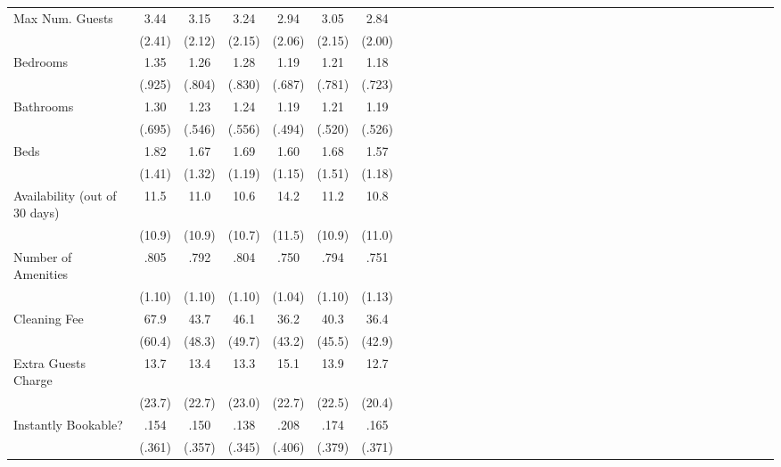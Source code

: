 {\begin{longtable}{l*{6}{c|c|cccc}}
Max Num. Guests   & 3.44   &      3.15	&      3.24  &      2.94		&    3.05 		&	 2.84\\
               & (2.41)    &     (2.12)         &     (2.15)         &     (2.06)         &     (2.15)         & (2.00)\\
Bedrooms    &  1.35 &      1.26 &      1.28         &      1.19         &      1.21   & 1.18      \\
              &   (.925)   &     (.804)         &     (.830)         &     (.687)         &     (.781)       & (.723)  \\
Bathrooms  & 1.30  &      1.23         &       1.24         &      1.19         &      1.21 & 1.19         \\
                &  (.695)  &     (.546)         &     (.556)         &     (.494)         &     (.520)         & (.526)\\
Beds       & 1.82  &      1.67 &      1.69         &      1.60         &      1.68         & 1.57\\
               &   (1.41)  &     (1.32)         &     (1.19)         &     (1.15)         &     (1.51)   & (1.18)      \\
Availability (out of 30 days)    & 11.5   &      11.0&      10.6&      14.2 &      11.2  	& 	10.8\\
         &  (10.9)    & (10.9)     &     (10.7)  &     (11.5)  &     (10.9)         &     (11.0)         \\
Number of Amenities   &   .805  &      .792		&      .804&      .750 &      .794  	& 	.751\\
         						  &  (1.10)  & (1.10)     &     (1.10)    &     (1.04)         &     (1.10)         &     (1.13)         \\
Cleaning Fee   &  67.9 &      43.7	&      46.1 &      36.2 &      40.3  	& 	36.4\\
						&  (60.4)  & (48.3)     &     (49.7)         &     (43.2)         &     (45.5)     &     (42.9)         \\
Extra Guests Charge   &   13.7  &  13.4      &    13.3  &      15.1           &   13.9  	& 	12.7\\
									&  (23.7)  & (22.7)  &     (23.0) &     (22.7)     &     (22.5) &     (20.4)  \\
Instantly Bookable?   &   .154  &      .150		&      .138 &      .208  &      .174  	& 	.165\\
									&  (.361)  & (.357)     &     (.345)  &     (.406)   &     (.379)   &     (.371)         \\

\end{longtable}}
